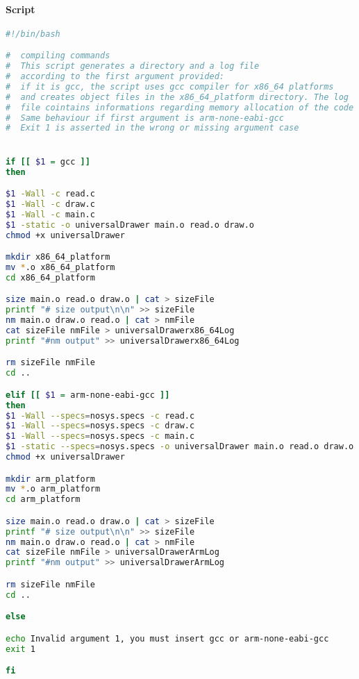 \documentclass{article}
\begin{document}
		\paragraph{Script}
		\begin{center}
		\begin{lstlisting}[language=bash, basicstyle=\small]
#!/bin/bash

#  compiling commands
#  This script generates a directory and a log file
#  according to the first argument provided:
#  if it is gcc, the script uses gcc compiler for x86_64 platforms
#  and creates object files in the x86_64_platform directory. The log
#  file cointains informations regarding memory allocation of the code
#  Same behaviour if first argument is arm-none-eabi-gcc
#  Exit 1 is asserted in the wrong or missing argument case


if [[ $1 = gcc ]]
then

$1 -Wall -c read.c 
$1 -Wall -c draw.c 
$1 -Wall -c main.c
$1 -static -o universalDrawer main.o read.o draw.o
chmod +x universalDrawer

mkdir x86_64_platform
mv *.o x86_64_platform
cd x86_64_platform

size main.o read.o draw.o | cat > sizeFile 
printf "# size output\n\n" >> sizeFile
nm main.o draw.o read.o | cat > nmFile
cat sizeFile nmFile > universalDrawerx86_64Log
printf "#nm output" >> universalDrawerx86_64Log

rm sizeFile nmFile
cd ..

elif [[ $1 = arm-none-eabi-gcc ]]
then
$1 -Wall --specs=nosys.specs -c read.c 
$1 -Wall --specs=nosys.specs -c draw.c 
$1 -Wall --specs=nosys.specs -c main.c
$1 -static --specs=nosys.specs -o universalDrawer main.o read.o draw.o
chmod +x universalDrawer

mkdir arm_platform
mv *.o arm_platform
cd arm_platform

size main.o read.o draw.o | cat > sizeFile 
printf "# size output\n\n" >> sizeFile
nm main.o draw.o read.o | cat > nmFile
cat sizeFile nmFile > universalDrawerArmLog
printf "#nm output" >> universalDrawerArmLog

rm sizeFile nmFile
cd ..

else

echo Invalid argument 1, you must insert gcc or arm-none-eabi-gcc
exit 1

fi
		\end{lstlisting}
		\end{center}
\end{document}
